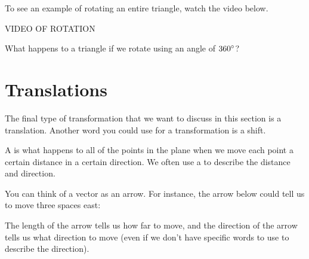 \documentclass{ximera}
\begin{document}
To see an example of rotating an entire triangle, watch the video below.

VIDEO OF ROTATION

\begin{question}
What happens to a triangle if we rotate using an angle of $360\degree$?
\begin{multipleChoice}
\end{multipleChoice}
\end{question}


\section{Translations}
The final type of transformation that we want to discuss in this section is a translation. Another word you could use for a transformation is a shift.
\begin{definition}
A  is what happens to all of the points in the plane when we move each point a certain distance in a certain direction. We often use a  to describe the distance and direction.
\end{definition}
You can think of a vector as an arrow. For instance, the arrow below could tell us to move three spaces east:
\begin{image}
\end{image}
The length of the arrow tells us how far to move, and the direction of the arrow tells us what direction to move (even if we don't have specific words to use to describe the direction). 
\end{document}
